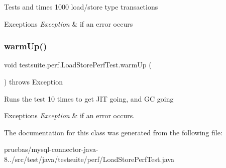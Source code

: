 Tests and times 1000 load/store type transactions


\begin{DoxyExceptions}{Exceptions}
{\em Exception} & if an error occurs \\
\hline
\end{DoxyExceptions}
\mbox{\label{classtestsuite_1_1perf_1_1_load_store_perf_test_aedfa3a61f8e71a59e738a6b6e9d27d0e}} 
\subsubsection{\texorpdfstring{warm\+Up()}{warmUp()}}
{\footnotesize\ttfamily void testsuite.\+perf.\+Load\+Store\+Perf\+Test.\+warm\+Up (\begin{DoxyParamCaption}{ }\end{DoxyParamCaption}) throws Exception\hspace{0.3cm}{\ttfamily [protected]}}

Runs the test 10 times to get J\+IT going, and GC going


\begin{DoxyExceptions}{Exceptions}
{\em Exception} & if an error occurs. \\
\hline
\end{DoxyExceptions}


The documentation for this class was generated from the following file\+:\begin{DoxyCompactItemize}
\item 
pruebas/mysql-\/connector-\/java-\/8../src/test/java/testsuite/perf/Load\+Store\+Perf\+Test.\+java\end{DoxyCompactItemize}
